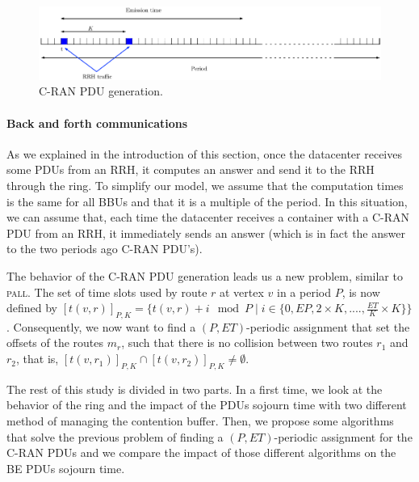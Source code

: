 \documentclass[]{algotel}
\newcommand\pall{\textsc{pall}\xspace}
\begin{document}
        \begin{figure}[h!]
\begin{center}   

      \includegraphics[width=\textwidth]{emission_antenna.pdf}
     \caption{C-RAN PDU generation.}
\end{center}
  \end{figure}
  \paragraph{Back and forth communications} As we explained in the introduction of this section, once the datacenter receives some PDUs from an RRH, it computes an answer and send it to the RRH through the ring. To simplify our model, we assume that the computation times is the same for all BBUs and that it is a multiple of the period. In this situation, we can assume that, each time the datacenter receives a container with a C-RAN PDU from an RRH, it immediately sends an answer (which is in fact the answer to the two periods ago C-RAN PDU's).
  
  
 The behavior of the C-RAN PDU generation leads us a new problem, similar to \pall. The set of time slots used by route $r$ at vertex $v$ in a period $P$, is now defined by $[t(v,r)]_{P,K} = \{t(v,r) +i \mod P \mid i \in \{0,EP,2\times K,...., \frac{ET}{K}\times K\} \}$. Consequently, we now want to find a $(P,ET)$-periodic assignment that set the offsets of the routes $m_r$, such that there is no collision between two routes $r_1$ and $r_2$, that is, $[t(v,r_{1})]_{P,K} \cap [t(v,r_{2})]_{P,K} \neq \emptyset$. 
  
  
  
 The rest of this study is divided in two parts. In a first time, we look at the behavior of the ring and the impact of the PDUs sojourn time with two different method of managing the contention buffer. Then, we propose some algorithms that solve the previous problem of finding a $(P,ET)$-periodic assignment for the C-RAN PDUs and we compare the impact of those different algorithms on the BE PDUs sojourn time.
\end{document}
